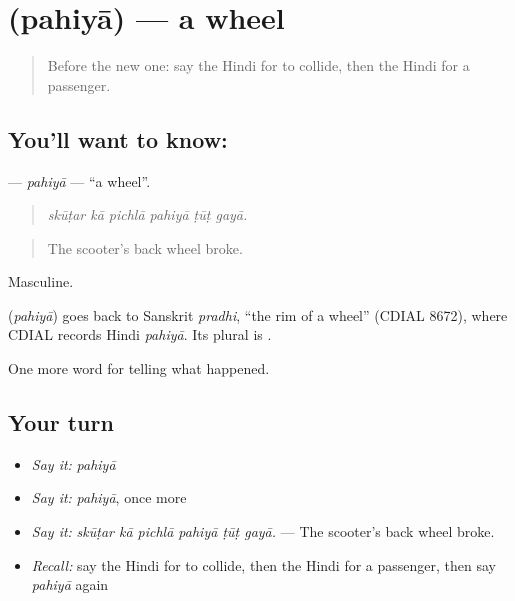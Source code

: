 \section[\texorpdfstring{\hi{पहिया} (pahiyā)}{पहिया (pahiyā)}]{ (pahiyā) — a wheel}

\label{lesson:HI-C296-pahiya}



\begin{quote}
Before the new one: say the Hindi for to collide, then the Hindi for a passenger.
\end{quote}

\subsection*{You'll want to know: }
\textbf{} — \emph{pahiyā} — \textquotedblleft{}a wheel\textquotedblright{}.

\begin{quote}
     
\end{quote}

\begin{quote}
\emph{skūṭar kā pichlā pahiyā ṭūṭ gayā.}
\end{quote}

\begin{quote}
The scooter's back wheel broke.
\end{quote}

Masculine.

\begin{cousinweb}
\textbf{} (\emph{pahiyā}) goes back to Sanskrit \emph{pradhi}, \textquotedblleft{}the rim of a wheel\textquotedblright{} (CDIAL 8672), where CDIAL records Hindi \emph{pahiyā}. Its plural is \textbf{}.
\end{cousinweb}

\begin{grammarlens}[title={What you've built}]
One more word for telling what happened.
\end{grammarlens}

\subsection*{Your turn}
\begin{itemize}
\raggedright
  \item \emph{Say it:} \emph{pahiyā}
  \item \emph{Say it:} \emph{pahiyā}, once more
  \item \emph{Say it:} \emph{skūṭar kā pichlā pahiyā ṭūṭ gayā.} — The scooter's back wheel broke.
  \item \emph{Recall:} say the Hindi for to collide, then the Hindi for a passenger, then say \emph{pahiyā} again
\end{itemize}


